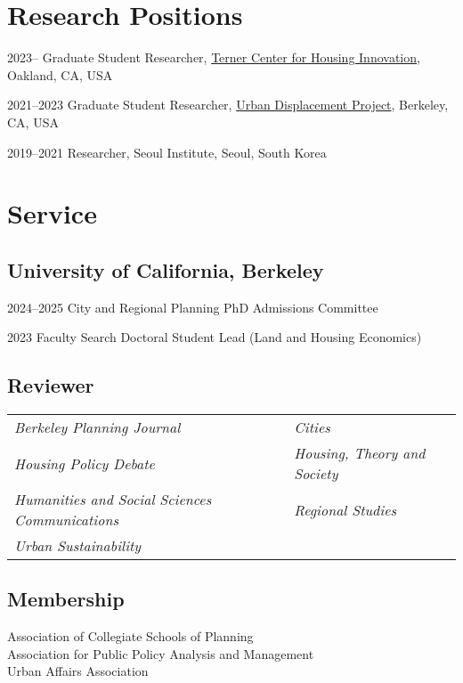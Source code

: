\documentclass[11pt,letterpaper]{article}
\begin{document}
\section{Research Positions}
\begin{tablist}
  \item[2023– ] \tab{}Graduate Student Researcher, \href{https://ternercenter.berkeley.edu/}{Terner Center for Housing Innovation}, Oakland, CA, USA
  \item[2021–2023] \tab{}Graduate Student Researcher, \href{https://www.urbandisplacement.org/}{Urban Displacement Project}, Berkeley, CA, USA
  \item[2019–2021] \tab{}Researcher, Seoul Institute, Seoul, South Korea
\end{tablist}

\section{Service}

\subsection{University of California, Berkeley}
\begin{tablist}
  \item[2024–2025] \tab{}City and Regional Planning PhD Admissions Committee
  \item[2023] \tab{}Faculty Search Doctoral Student Lead (Land and Housing Economics)
\end{tablist}

\subsection{Reviewer}
\begin{tabular}{@{}p{} p{}@{}}
\emph{Berkeley Planning Journal} & \emph{Cities}\\
\emph{Housing Policy Debate} & \emph{Housing, Theory and Society}\\
\emph{Humanities and Social Sciences Communications} & \emph{Regional Studies}\\
\emph{Urban Sustainability} &
\end{tabular}

\subsection{Membership}
Association of Collegiate Schools of Planning\\
Association for Public Policy Analysis and Management\\
Urban Affairs Association
\end{document}
